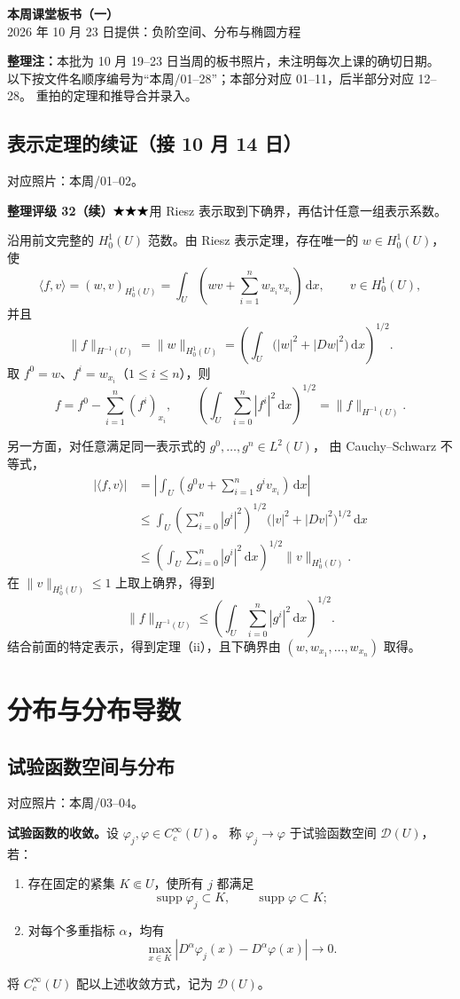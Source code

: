 \documentclass[UTF8,a4paper,11pt,fontset=fandol]{ctexart}
\newcommand{\dd}{\,\mathrm d}
\newcommand{\ednote}[1]{\par{\small\color{notegray}\textbf{整理注：}#1}\par}
\newcommand{\source}[1]{{\small\color{notegray}对应照片：#1。}\par}
\newcommand{\proofstars}[1]{\ensuremath{%
\ifnum#1>0\relax\bigstar\fi
\ifnum#1>1\relax\bigstar\fi
\ifnum#1>2\relax\bigstar\fi
\ifnum#1>3\relax\bigstar\fi
\ifnum#1>4\relax\bigstar\fi}}
\newcommand{\proofrating}[3]{\par{\small\color{proofblue}%
\textbf{整理评级 #1}\enspace\proofstars{#2}\quad #3\par}}
\begin{document}
\newpage
{}
\begin{center}
{\LARGE\bfseries 本周课堂板书（一）}\\[5pt]
{2026 年 10 月 23 日提供：负阶空间、分布与椭圆方程}
\end{center}
\ednote{本批为 10 月 19--23 日当周的板书照片，未注明每次上课的确切日期。
以下按文件名顺序编号为“本周/01--28”；本部分对应 01--11，后半部分对应 12--28。
重拍的定理和推导合并录入。}

\subsection*{表示定理的续证（接 10 月 14 日）}
\source{本周/01--02}
\proofrating{32（续）}{3}{用 Riesz 表示取到下确界，再估计任意一组表示系数。}
沿用前文完整的 $H_0^1(U)$ 范数。由 Riesz 表示定理，存在唯一的
$w\in H_0^1(U)$，使
\[
\langle f,v\rangle=(w,v)_{H_0^1(U)}
=\int_U\left(wv+\sum_{i=1}^nw_{x_i}v_{x_i}\right)\dd x,
\qquad v\in H_0^1(U),
\]
并且
\[
\|f\|_{H^{-1}(U)}=\|w\|_{H_0^1(U)}
=\left(\int_U\bigl(|w|^2+|Dw|^2\bigr)\dd x\right)^{1/2}.
\]
取 $f^0=w$、$f^i=w_{x_i}$（$1\leq i\leq n$），则
\[
f=f^0-\sum_{i=1}^n(f^i)_{x_i},\qquad
\left(\int_U\sum_{i=0}^n|f^i|^2\dd x\right)^{1/2}
=\|f\|_{H^{-1}(U)}.
\]

另一方面，对任意满足同一表示式的 $g^0,\ldots,g^n\in L^2(U)$，
由 Cauchy--Schwarz 不等式，
\[
\begin{aligned}
|\langle f,v\rangle|
&=\left|\int_U\left(g^0v+\sum_{i=1}^ng^iv_{x_i}\right)\dd x\right|\\
&\leq\int_U\left(\sum_{i=0}^n|g^i|^2\right)^{1/2}
               \bigl(|v|^2+|Dv|^2\bigr)^{1/2}\dd x\\
&\leq\left(\int_U\sum_{i=0}^n|g^i|^2\dd x\right)^{1/2}
       \|v\|_{H_0^1(U)}.
\end{aligned}
\]
在 $\|v\|_{H_0^1(U)}\leq1$ 上取上确界，得到
\[
\|f\|_{H^{-1}(U)}
\leq\left(\int_U\sum_{i=0}^n|g^i|^2\dd x\right)^{1/2}.
\]
结合前面的特定表示，得到定理（ii），且下确界由
$(w,w_{x_1},\ldots,w_{x_n})$ 取得。

\newpage
\section{分布与分布导数}
\subsection{试验函数空间与分布}
\source{本周/03--04}
\textbf{试验函数的收敛。}设 $\varphi_j,\varphi\in C_c^\infty(U)$。
称 $\varphi_j\to\varphi$ 于试验函数空间 $\mathcal D(U)$，若：
\begin{enumerate}
\item 存在固定的紧集 $K\Subset U$，使所有 $j$ 都满足
\[
\operatorname{supp}\varphi_j\subset K,\qquad
\operatorname{supp}\varphi\subset K;
\]
\item 对每个多重指标 $\alpha$，均有
\[
\max_{x\in K}|D^\alpha\varphi_j(x)-D^\alpha\varphi(x)|\longrightarrow0.
\]
\end{enumerate}
将 $C_c^\infty(U)$ 配以上述收敛方式，记为 $\mathcal D(U)$。
\end{document}
